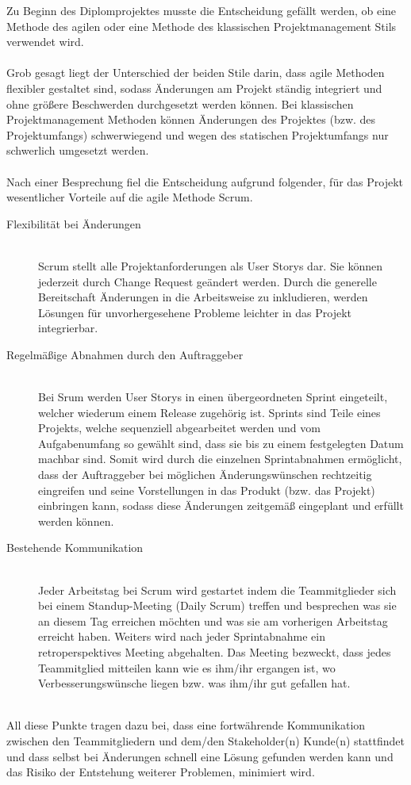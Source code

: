 \setcounter{page}{19}
Zu Beginn des Diplomprojektes musste die Entscheidung gefällt werden, ob eine Methode des agilen oder eine Methode des klassischen Projektmanagement Stils
verwendet wird.\\ \mbox{} \\
Grob gesagt liegt der Unterschied der beiden Stile darin, dass agile Methoden flexibler gestaltet sind, sodass Änderungen am Projekt ständig integriert und ohne größere Beschwerden durchgesetzt werden können. Bei klassischen Projektmanagement Methoden können Änderungen des Projektes (bzw. des Projektumfangs) schwerwiegend und wegen des statischen Projektumfangs nur schwerlich umgesetzt werden. \\ \mbox{} \\
Nach einer Besprechung fiel die Entscheidung aufgrund folgender, für das Projekt wesentlicher Vorteile auf die agile Methode Scrum. 
\begin{description}
     \item[Flexibilität bei Änderungen]\mbox{} \\
    Scrum stellt alle Projektanforderungen als User Storys dar. Sie können jederzeit durch Change Request geändert werden. Durch die generelle Bereitschaft Änderungen in die Arbeitsweise zu inkludieren, werden Lösungen für unvorhergesehene Probleme leichter in das Projekt integrierbar.
     \item[Regelmäßige Abnahmen durch den Auftraggeber]\mbox{} \\
    Bei Srum werden User Storys in einen übergeordneten Sprint eingeteilt, welcher wiederum einem Release zugehörig ist. Sprints sind Teile eines Projekts, welche sequenziell abgearbeitet werden und vom Aufgabenumfang so gewählt sind, dass sie bis zu einem festgelegten Datum machbar sind. Somit wird durch die einzelnen Sprintabnahmen ermöglicht, dass der Auftraggeber bei möglichen Änderungswünschen rechtzeitig eingreifen und seine Vorstellungen in das Produkt (bzw. das Projekt) einbringen kann, sodass diese Änderungen zeitgemäß eingeplant und erfüllt werden können.
     \item[Bestehende Kommunikation]\mbox{} \\
    Jeder Arbeitstag bei Scrum wird gestartet indem die Teammitglieder sich bei einem Standup-Meeting (Daily Scrum) treffen und besprechen was sie an diesem Tag erreichen möchten und was sie am vorherigen Arbeitstag erreicht haben. Weiters wird nach jeder Sprintabnahme ein retroperspektives Meeting abgehalten. Das Meeting bezweckt, dass jedes Teammitglied mitteilen kann wie es ihm/ihr ergangen ist, wo Verbesserungswünsche liegen bzw. was ihm/ihr gut gefallen hat.
\end{description}
\mbox{} \\
All diese Punkte tragen dazu bei, dass eine fortwährende Kommunikation zwischen den Teammitgliedern und dem/den Stakeholder(n) Kunde(n) stattfindet und dass selbst bei Änderungen schnell eine Lösung gefunden werden kann und das Risiko der Entstehung weiterer Problemen, minimiert wird.